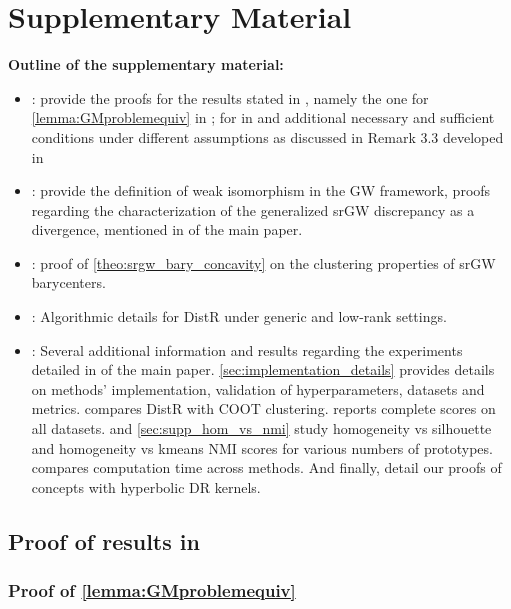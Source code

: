 \section{Supplementary Material}

\textbf{Outline of the supplementary material:}
\begin{itemize}
	\item {}: provide the proofs for the results stated in , namely the one for \cref{lemma:GMproblemequiv} in ; for  in   and additional necessary and sufficient conditions under different assumptions as discussed in Remark 3.3 developed in 
	\item {}: provide the definition of weak isomorphism in the GW framework, proofs regarding the characterization of the generalized srGW discrepancy as a divergence, mentioned in  of the main paper.
	\item {}: proof of \cref{theo:srgw_bary_concavity} on the clustering properties of srGW barycenters.
	\item {}: Algorithmic details for DistR under generic and low-rank settings.
	\item {}: Several additional information and results regarding the experiments detailed in  of the main paper. \ref{sec:implementation_details} provides details on methods' implementation, validation of hyperparameters, datasets and metrics.  compares DistR with COOT clustering.  reports complete scores on all datasets.  and \ref{sec:supp_hom_vs_nmi} study homogeneity vs silhouette and homogeneity vs kmeans NMI scores for various numbers of prototypes.  compares computation time across methods. And finally,  detail our proofs of concepts with hyperbolic DR kernels.

\end{itemize}

\subsection{Proof of results in }\label{sec:DR_as_OT_supp}

\subsubsection{Proof of \cref{lemma:GMproblemequiv} \label{proof:GMproblemequiv}}

